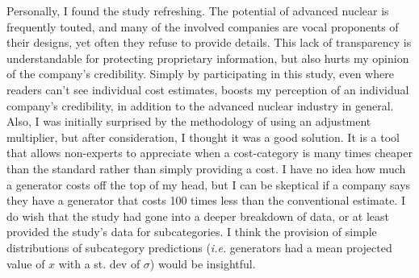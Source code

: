 \documentclass{report}
\newcommand{\tab}{\-\hspace{1cm}}
\begin{document}
\tab Personally, I found the study refreshing. The potential of advanced nuclear is frequently touted, and many of the involved companies are vocal proponents of their designs, yet often they refuse to provide details. This lack of transparency is understandable for protecting proprietary information, but also hurts my opinion of the company's credibility. Simply by participating in this study, even where readers can't see individual cost estimates, boosts my perception of an individual company's credibility, in addition to the advanced nuclear industry in general. Also, I was initially surprised by the methodology of using an adjustment multiplier, but after consideration, I thought it was a good solution. It is a tool that allows non-experts to appreciate when a cost-category is many times cheaper than the standard rather than simply providing a cost. I have no idea how much a generator costs off the top of my head, but I can be skeptical if a company says they have a generator that costs 100 times less than the conventional estimate. I do wish that the study had gone into a deeper breakdown of data, or at least provided the study's data for subcategories. I think the provision of simple distributions of subcategory predictions (\textit{i.e.} generators had a mean projected value of $x$ with a st. dev of $\sigma$) would be insightful.\\
\end{document}
